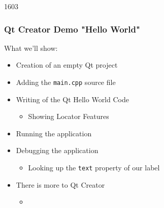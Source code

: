 \begin{slide}{1603}
  \frametitle{Qt Creator Demo "Hello World"}
  What we'll show:
  \begin{itemize}
  \item Creation of an empty Qt project
  \item Adding the \texttt{main.cpp} source file
  \item Writing of the Qt Hello World Code
    \begin{itemize}
    \item Showing Locator Features
    \end{itemize}
  \item Running the application
  \item Debugging the application
    \begin{itemize}
    \item Looking up the \texttt{text} property of our label
    \end{itemize}
  \end{itemize}
  \smallskip
  \begin{itemize}
  \item There is more to Qt Creator
    \begin{itemize}
    \item[] 
    \end{itemize}
  \end{itemize}
\end{slide}
